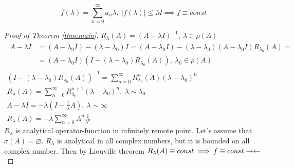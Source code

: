 \begin{thm}[Liouville]
  \[
    f(\lambda) = \sum_{n = 0}^\infty a_n \lambda,\ 
    |f(\lambda)| \leq M \implies f \equiv const
  \]
\end{thm}

\begin{proof}[Proof of Theorem \ref{thm:main}]
  $R_\lambda(A) = (A - \lambda I)^{-1},\ \lambda \in \rho(A)$ \\
  \begin{gather*}
    \begin{split}
      A - \lambda I & = (A - \lambda_0 I) - (\lambda - \lambda_0) I = (A - \lambda_0 I) - (\lambda - \lambda_0) (A - \lambda_0 I) R_{\lambda_0}(A) = {}\\
                    & = (A - \lambda_0 I)(I - (\lambda - \lambda_0)R_{\lambda_0}(A)),\ \lambda_0 \in \rho(A) 
    \end{split} \\
    (I - (\lambda - \lambda_0) R_{\lambda_0}(A))^{-1} = \sum_{n=0}^\infty R_{\lambda_0}^n(A)(\lambda - \lambda_0)^n \\
    R_\lambda(A)  = \sum_{n=0}^\infty R_{\lambda_0}^{n + 1} (\lambda - \lambda_0)^n,\ \lambda \sim \lambda_0 \\
    A - \lambda I = -\lambda(I - \tfrac 1\lambda A),\ \lambda \sim \infty \\
    R_\lambda(A)  = -\lambda \sum_{n = 0}^\infty A^n \frac{1}{\lambda^n}
  \end{gather*}
  $R_\lambda$ is analytical operator-function in infinitely remote point.
  Let's assume that $\sigma(A) = \varnothing$. 
  $R_\lambda$ is analytical in all complex numbers, but it is bounded on all
  complex number. Then by Liouville theorem $R_\lambda(A) \equiv const \implies
  f \equiv const \rightarrow\leftarrow$
\end{proof}
